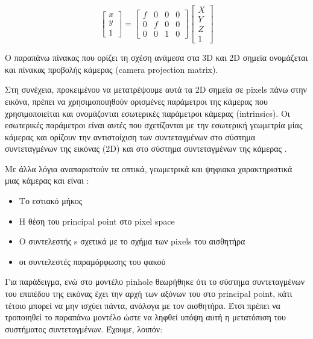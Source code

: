 \begin{equation}
\begin{bmatrix}
x\\y\\1
\end{bmatrix}
=
\begin{bmatrix}
f & 0 & 0 & 0\\
0 & f & 0 & 0\\
0 & 0 & 1 & 0
\end{bmatrix}
\begin{bmatrix}
X\\
Y\\
Z\\
1
\end{bmatrix}
\end{equation}


Ο παραπάνω πίνακας που ορίζει τη σχέση ανάμεσα στα 3D και 2D σημεία ονομάζεται και πίνακας προβολής κάμερας (camera projection matrix).




Στη συνέχεια, προκειμένου να μετατρέψουμε αυτά τα 2D σημεία σε pixels πάνω στην εικόνα, πρέπει να χρησιμοποιηθούν ορισμένες παράμετροι της κάμερας που χρησιμοποιείται και ονομάζονται εσωτερικές παράμετροι κάμερας (intrinsics).
Οι εσωτερικές παράμετροι είναι αυτές που σχετίζονται με την εσωτερική γεωμετρία μίας κάμερας και ορίζουν την αντιστοίχιση των συντεταγμένων στο σύστημα συντεταγμένων της εικόνας (2D) και στο σύστημα συντεταγμένων της κάμερας \cite{Malik2002}. 


Με άλλα λόγια αναπαριστούν τα οπτικά, γεωμετρικά και ψηφιακα χαρακτηριστικά μιας κάμερας και είναι :

\begin{itemize}
\item Το εστιακό μήκος
\item Η θέση του principal point στο pixel space
\item Ο συντελεστής s σχετικά με το σχήμα των pixels του αισθητήρα
\item οι συντελεστές παραμόρφωσης του φακού
\end{itemize}



Για παράδειγμα, ενώ στο μοντέλο pinhole θεωρήθηκε ότι το σύστημα συντεταγμένων του επιπέδου της εικόνας έχει την αρχή των αξόνων του στο principal point, κάτι τέτοιο μπορεί να μην ισχύει πάντα, ανάλογα με τον αισθητήρα. Έτσι πρέπει να τροποιηθεί το παραπάνω μοντέλο ώστε να ληφθεί υπόψη αυτή η μετατόπιση του συστήματος συντεταγμένων. Έχουμε, λοιπόν:


